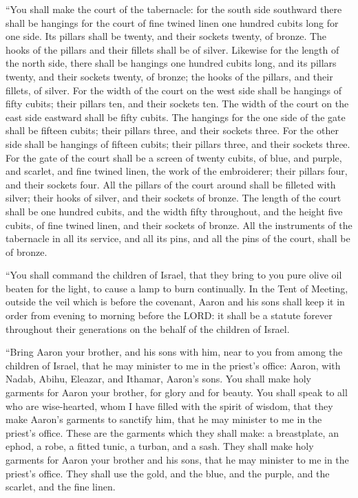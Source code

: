 \myverse{}“You shall make the court of the tabernacle: for the south side
southward there shall be hangings for the court of fine twined linen one hundred cubits long for one side.
\myverse{}Its pillars shall be twenty, and their sockets twenty, of bronze. The hooks
of the pillars and their fillets shall be of silver.
\myverse{}Likewise for the length of the north side, there shall be hangings one hundred
cubits long, and its pillars twenty, and their sockets twenty, of bronze; the hooks of the pillars, and
their fillets, of silver.
\myverse{}For the width of the court on the west side shall be hangings of fifty cubits;
their pillars ten, and their sockets ten.
\myverse{}The width of the court on the east side eastward shall be fifty cubits.
\myverse{}The hangings for the one side of the gate shall be fifteen cubits; their
pillars three, and their sockets three.
\myverse{}For the other side shall be hangings of fifteen cubits; their pillars three,
and their sockets three.
\myverse{}For the gate of the court shall be a screen of twenty cubits, of blue, and
purple, and scarlet, and fine twined linen, the work of the embroiderer; their pillars four, and their
sockets four.
\myverse{}All the pillars of the court around shall be filleted with silver; their
hooks of silver, and their sockets of bronze.
\myverse{}The length of the court shall be one hundred cubits, and the width fifty
throughout, and the height five cubits, of fine twined linen, and their sockets of bronze.
\myverse{}All the instruments of the tabernacle in all its service, and all its pins,
and all the pins of the court, shall be of bronze.


\myverse{}“You shall command the children of Israel, that they bring to
you pure olive oil beaten for the light, to cause a lamp to burn continually.
\myverse{}In the Tent of Meeting, outside the veil which is before the covenant, Aaron
and his sons shall keep it in order from evening to morning before the LORD: it shall be a statute forever
throughout their generations on the behalf of the children of Israel.


\mychapter{} \myverse*{}“Bring Aaron your brother, and his sons with him, near to you
from among the children of Israel, that he may minister to me in the priest’s office: Aaron, with Nadab,
Abihu, Eleazar, and Ithamar, Aaron’s sons.
\myverse{}You shall make holy garments for Aaron your brother, for glory and for beauty.
\myverse{}You shall speak to all who are wise-hearted, whom I have filled with the spirit
of wisdom, that they make Aaron’s garments to sanctify him, that he may minister to me in the priest’s
office.
\myverse{}These are the garments which they shall make: a breastplate, an ephod, a robe,
a fitted tunic, a turban, and a sash. They shall make holy garments for Aaron your brother and his sons,
that he may minister to me in the priest’s office.
\myverse{}They shall use the gold, and the blue, and the purple, and the scarlet, and
the fine linen.


